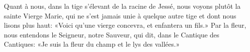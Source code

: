 Quant à nous, dans la tige s’élevant de la racine de Jessé,
	nous voyons plutôt la sainte Vierge Marie,
	qui ne s’est jamais unie à quelque autre tige
	et dont nous lisons plus haut:
	«Voici qu’une vierge concevra, et enfantera un fils.»
Par la fleur, nous entendons le Seigneur, notre Sauveur,
	qui dit, dans le Cantique des Cantiques:
	«Je suis la fleur du champ et le lys des vallées.»
